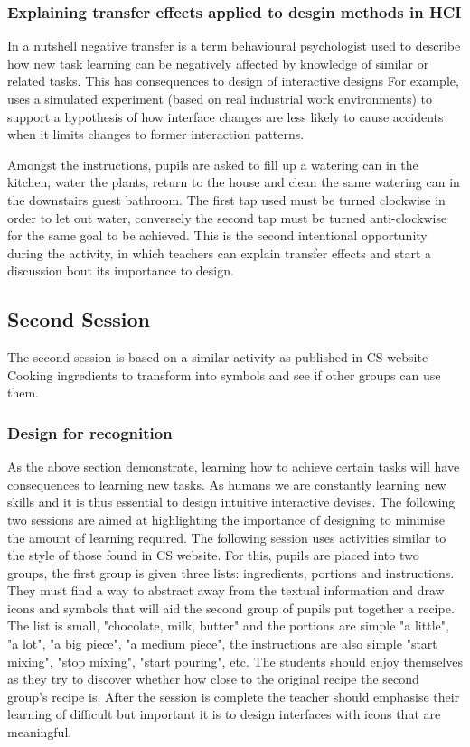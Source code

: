 \documentclass{sig-alternate}
\begin{document}
\subsubsection*{Explaining transfer effects applied to desgin methods in HCI}
In a nutshell negative transfer\cite{Lunchin, Pan2010, Woltz} is a term behavioural psychologist used to describe how new task learning can be negatively affected by knowledge of similar or related tasks.
This has consequences to design of interactive designs \cite{waern1993varieties} For example,\cite{Besnard2005105} uses a simulated experiment (based on real industrial work environments) to support a hypothesis of how interface changes are less likely to cause accidents when it limits changes to former interaction patterns.

Amongst the instructions, pupils are asked to fill up a watering can in the kitchen, water the plants, return to the house and clean the same watering can in the downstairs guest bathroom. The first tap used must be turned clockwise in order to let out water, conversely the second tap must be turned anti-clockwise for the same goal to be achieved. This is the second intentional opportunity during the activity, in which teachers can explain transfer effects and start a discussion bout its importance to design.

\subsection{Second Session}
The second session is based on a similar activity as published in {CS website}
Cooking ingredients to transform into symbols and see if other groups can use them.

\subsubsection*{Design for recognition}
 
As the above section demonstrate, learning how to achieve certain tasks will have consequences to learning new tasks. As humans we are constantly learning new skills and it is thus essential to design intuitive interactive devises. The following two sessions are aimed at highlighting the importance of designing to minimise the amount of learning required. The following session uses activities similar to the style of those found in {CS website}.
For this, pupils are placed into two groups, the first group is given three lists: ingredients, portions and instructions. They must find a way to abstract away from the textual information and draw icons and symbols that will aid the second group of pupils put together a recipe. The list is small, "chocolate, milk, butter" and the portions are simple "a little", "a lot", "a big piece", "a medium piece", the instructions are also simple "start mixing", "stop mixing", "start pouring", etc. The students should enjoy themselves as they try to discover whether how close to the original recipe the second group's recipe is. After the session is complete the teacher should emphasise their learning of difficult but important it is to design interfaces with icons that are meaningful. 
\end{document}
